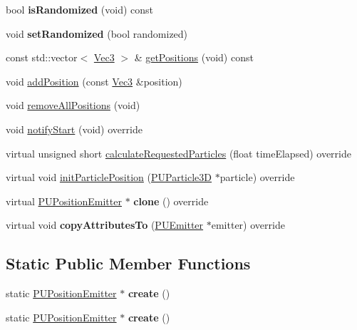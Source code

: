\begin{DoxyCompactItemize}
bool {\bfseries is\+Randomized} (void) const
\item 
\mbox{\label{classPUPositionEmitter_a6d7e2c7c78873a17970e5818db741a36}} 
void {\bfseries set\+Randomized} (bool randomized)
\item 
const std\+::vector$<$ \hyperlink{classVec3}{Vec3} $>$ \& \hyperlink{classPUPositionEmitter_a0d0f0405ff941db509576f4a2192576e}{get\+Positions} (void) const
\item 
void \hyperlink{classPUPositionEmitter_a903a6a3c8124f015c880ffe22a89e0e7}{add\+Position} (const \hyperlink{classVec3}{Vec3} \&position)
\item 
void \hyperlink{classPUPositionEmitter_a72b416af36fd90660a8d1778b559fefd}{remove\+All\+Positions} (void)
\item 
void \hyperlink{classPUPositionEmitter_ae71cdf6eae8f3dc4d66baace5d9785ba}{notify\+Start} (void) override
\item 
virtual unsigned short \hyperlink{classPUPositionEmitter_a3e87a896845a2b42cf830a3bebb22d92}{calculate\+Requested\+Particles} (float time\+Elapsed) override
\item 
virtual void \hyperlink{classPUPositionEmitter_a6e2e82f753f3339a4981f3c8d80d1b48}{init\+Particle\+Position} (\hyperlink{structPUParticle3D}{P\+U\+Particle3D} $\ast$particle) override
\item 
\mbox{\label{classPUPositionEmitter_a217ddbd12c437ba14c3576f49a41f302}} 
virtual \hyperlink{classPUPositionEmitter}{P\+U\+Position\+Emitter} $\ast$ {\bfseries clone} () override
\item 
\mbox{\label{classPUPositionEmitter_a098f9259771527de40a755e3dc110574}} 
virtual void {\bfseries copy\+Attributes\+To} (\hyperlink{classPUEmitter}{P\+U\+Emitter} $\ast$emitter) override
\end{DoxyCompactItemize}
\subsection*{Static Public Member Functions}
\begin{DoxyCompactItemize}
\item 
\mbox{\label{classPUPositionEmitter_abcd5e11512b2d75760b368eb741a57f1}} 
static \hyperlink{classPUPositionEmitter}{P\+U\+Position\+Emitter} $\ast$ {\bfseries create} ()
\item 
\mbox{\label{classPUPositionEmitter_a01cab306b3905622f5d63df4a06715d7}} 
static \hyperlink{classPUPositionEmitter}{P\+U\+Position\+Emitter} $\ast$ {\bfseries create} ()
\end{DoxyCompactItemize}
